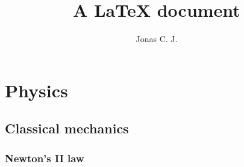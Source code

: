 \documentclass[a4paper, 12pt]{article}
\title{A \LaTeX{} document}
\author{Jonas C. J.}
\begin{document}
\maketitle
\section{Physics}
\subsection{Classical mechanics}
\subsubsection{Newton's II law}
\end{document}
